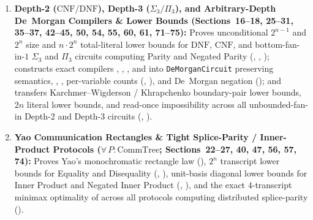 \documentclass[11pt,a4paper]{article}
\theoremstyle{definition}
\begin{document}
{\begin{enumerate}
    \item \textbf{Depth-2 ($\mathrm{CNF}/\mathrm{DNF}$), Depth-3 ($\Sigma_3/\Pi_3$), and Arbitrary-Depth De~Morgan Compilers \& Lower Bounds (Sections~16--18, 25--31, 35--37, 42--45, 50, 54, 55, 60, 61, 71--75):} Proves unconditional $2^{n-1}$ and $2^n$ size and $n\cdot 2^n$ total-literal lower bounds for $\mathrm{DNF}$, $\mathrm{CNF}$, and bottom-fan-in-$1$ $\Sigma_3$ and $\Pi_3$ circuits computing Parity and Negated Parity (, , ); constructs exact compilers , , , and  into \texttt{DeMorganCircuit} preserving semantics, , , per-variable counts (, ), and De~Morgan negation (); and transfers Karchmer--Wigderson / Khrapchenko boundary-pair lower bounds, $2n$ literal lower bounds, and read-once impossibility across all unbounded-fan-in Depth-2 and Depth-3 circuits (, ).
    \item \textbf{Yao Communication Rectangles \& Tight Splice-Parity / Inner-Product Protocols ($\forall\,P : \mathrm{CommTree}$; Sections~22--27, 40, 47, 56, 57, 74):} Proves Yao's monochromatic rectangle law (), $2^n$ transcript lower bounds for Equality and Disequality (, ), unit-basis diagonal lower bounds for Inner Product and Negated Inner Product (, ), and the exact $4$-transcript minimax optimality of  across all protocols computing distributed splice-parity ().
\end{enumerate}
\par}
\end{document}
